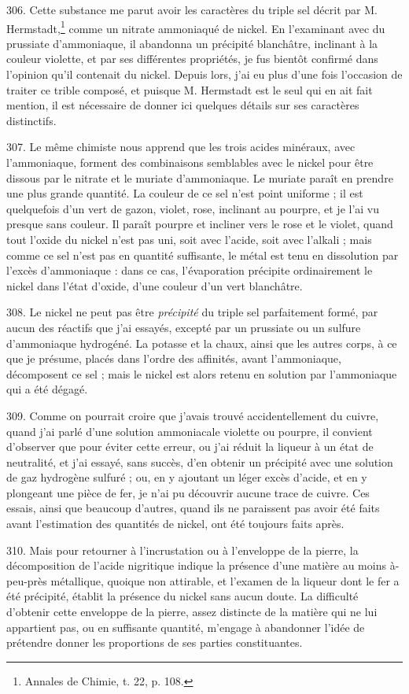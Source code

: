 \documentclass[a4paper, 11pt, oneside, polutonikogreek, french]{article}
\begin{document}
306. Cette substance me parut avoir les caractères du triple sel décrit par M. Hermstadt,\footnote{Annales de Chimie, t. 22, p. 108.} comme un nitrate ammoniaqué de nickel. En l'examinant avec du prussiate d'ammoniaque, il abandonna un précipité blanchâtre, inclinant à la couleur violette, et par ses différentes propriétés, je fus bientôt confirmé dans l'opinion qu'il contenait du nickel. Depuis lors, j'ai eu plus d'une fois l'occasion de traiter ce trible composé, et puisque M. Hermstadt est le seul qui en ait fait mention, il est nécessaire de donner ici quelques détails sur ses caractères distinctifs.

307. Le même chimiste nous apprend que les trois acides minéraux, avec l'ammoniaque, forment des combinaisons semblables avec le nickel pour être dissous par le nitrate et le muriate d'ammoniaque. Le muriate paraît en prendre une plus grande quantité. La couleur de ce sel n'est point uniforme ; il est quelquefois d'un vert de gazon, violet, rose, inclinant au pourpre, et je l'ai vu presque sans couleur. Il paraît pourpre et incliner vers le rose et le violet, quand tout l'oxide du nickel n'est pas uni, soit avec l'acide, soit avec l'alkali ; mais comme ce sel n'est pas en quantité suffisante, le métal est tenu en dissolution par l'excès d'ammoniaque : dans ce cas, l'évaporation précipite ordinairement le nickel dans l'état d'oxide, d'une couleur d'un vert blanchâtre.

308. Le nickel ne peut pas être \emph{précipité} du triple sel parfaitement formé, par aucun des réactifs que j'ai essayés, excepté par un prussiate ou un sulfure d'ammoniaque hydrogéné. La potasse et la chaux, ainsi que les autres corps, à ce que je présume, placés dans l'ordre des affinités, avant l'ammoniaque, décomposent ce sel ; mais le nickel est alors retenu en solution par l'ammoniaque qui a été dégagé.

309. Comme on pourrait croire que j'avais trouvé accidentellement du cuivre, quand j'ai parlé d'une solution ammoniacale violette ou pourpre, il convient d'observer que pour éviter cette erreur, ou j'ai réduit la liqueur à un état de neutralité, et j'ai essayé, sans succès, d'en obtenir un précipité avec une solution de gaz hydrogène sulfuré ; ou, en y ajoutant un léger excès d'acide, et en y plongeant une pièce de fer, je n'ai pu découvrir aucune trace de cuivre. Ces essais, ainsi que beaucoup d'autres, quand ils ne paraissent pas avoir été faits avant l'estimation des quantités de nickel, ont été toujours faits après.

310. Mais pour retourner à l'incrustation ou à l'enveloppe de la pierre, la décomposition de l'acide nigritique indique la présence d'une matière au moins à-peu-près métallique, quoique non attirable, et l'examen de la liqueur dont le fer a été précipité, établit la présence du nickel sans aucun doute. La difficulté d'obtenir cette enveloppe de la pierre, assez distincte de la matière qui ne lui appartient pas, ou en suffisante quantité, m'engage à abandonner l'idée de prétendre donner les proportions de ses parties constituantes.
\end{document}
